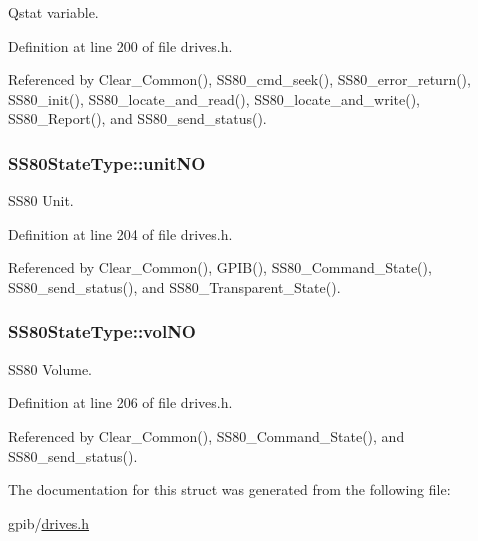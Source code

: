Qstat variable. 



Definition at line 200 of file drives.\+h.



Referenced by Clear\+\_\+\+Common(), S\+S80\+\_\+cmd\+\_\+seek(), S\+S80\+\_\+error\+\_\+return(), S\+S80\+\_\+init(), S\+S80\+\_\+locate\+\_\+and\+\_\+read(), S\+S80\+\_\+locate\+\_\+and\+\_\+write(), S\+S80\+\_\+\+Report(), and S\+S80\+\_\+send\+\_\+status().

\subsubsection[{\texorpdfstring{unit\+NO}{unitNO}}]{ S\+S80\+State\+Type\+::unit\+NO}\hypertarget{structSS80StateType_ad2b3cd5353f5650df931520a39b385e7}{}\label{structSS80StateType_ad2b3cd5353f5650df931520a39b385e7}


S\+S80 Unit. 



Definition at line 204 of file drives.\+h.



Referenced by Clear\+\_\+\+Common(), G\+P\+I\+B(), S\+S80\+\_\+\+Command\+\_\+\+State(), S\+S80\+\_\+send\+\_\+status(), and S\+S80\+\_\+\+Transparent\+\_\+\+State().

\subsubsection[{\texorpdfstring{vol\+NO}{volNO}}]{ S\+S80\+State\+Type\+::vol\+NO}\hypertarget{structSS80StateType_ac197866db7677ec4bf9ad5e29e4a58a3}{}\label{structSS80StateType_ac197866db7677ec4bf9ad5e29e4a58a3}


S\+S80 Volume. 



Definition at line 206 of file drives.\+h.



Referenced by Clear\+\_\+\+Common(), S\+S80\+\_\+\+Command\+\_\+\+State(), and S\+S80\+\_\+send\+\_\+status().



The documentation for this struct was generated from the following file\+:\begin{DoxyCompactItemize}
\item 
gpib/\hyperlink{drives_8h}{drives.\+h}\end{DoxyCompactItemize}

